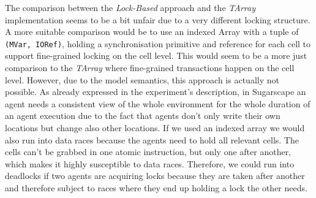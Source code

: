 The comparison between the \textit{Lock-Based} approach and the \textit{TArray} implementation seems to be a bit unfair due to a very different locking structure. A more suitable comparison would be to use an indexed Array with a tuple of \texttt{(MVar, IORef)}, holding a synchronisation primitive and reference for each cell to support fine-grained locking on the cell level. This would seem to be a more just comparison to the \textit{TArray} where fine-grained transactions happen on the cell level. However, due to the model semantics, this approach is actually not possible. As already expressed in the experiment's description, in Sugarscape an agent needs a consistent view of the whole environment for the whole duration of an agent execution due to the fact that agents don't only write their own locations but change also other locations. If we used an indexed array we would also run into data races because the agents need to hold all relevant cells. The cells can't be grabbed in one atomic instruction, but only one after another, which makes it highly susceptible to data races. Therefore, we could run into deadlocks if two agents are acquiring locks because they are taken after another and therefore subject to races where they end up holding a lock the other needs.